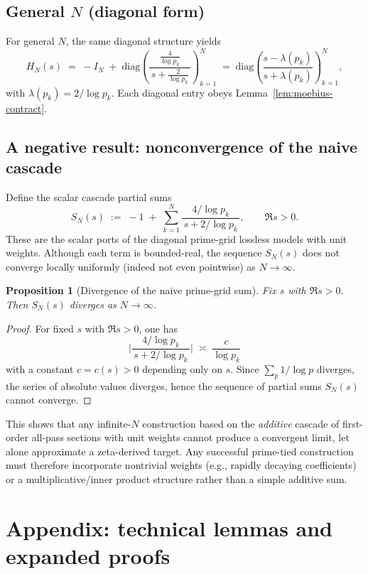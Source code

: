 \documentclass[11pt]{article}
\newtheorem{proposition}[theorem]{Proposition}
\theoremstyle{definition}
\theoremstyle{remark}
\begin{document}
\subsection*{General $N$ (diagonal form)}
For general \(N\), the same diagonal structure yields
\[
 H_N(s)\;=\;-I_N\; +\; \mathrm{diag}\!\left(\frac{\tfrac{4}{\log p_k}}{\,s+\tfrac{2}{\log p_k}\,}\right)_{k=1}^N\;=\;\mathrm{diag}\!\left(\frac{s-\lambda(p_k)}{s+\lambda(p_k)}\right)_{k=1}^N,
\]
with \(\lambda(p_k)=2/\log p_k\). Each diagonal entry obeys Lemma~\ref{lem:moebius-contract}.

\subsection*{A negative result: nonconvergence of the naive cascade}
Define the scalar cascade partial sums
\[
 S_N(s)\;:=\;-1\; +\;\sum_{k=1}^{N} \frac{4/\log p_k}{\,s+2/\log p_k\,},\qquad \Re s>0.
\]
These are the scalar ports of the diagonal prime-grid lossless models with unit weights. Although each term is bounded-real, the sequence \(S_N(s)\) does not converge locally uniformly (indeed not even pointwise) as \(N\to\infty\).

\begin{proposition}[Divergence of the naive prime-grid sum]\label{prop:divergence}
Fix \(s\) with \(\Re s>0\). Then \(S_N(s)\) diverges as \(N\to\infty\).
\end{proposition}
\begin{proof}
For fixed \(s\) with \(\Re s>0\), one has
\[
 \Big|\frac{4/\log p_k}{\,s+2/\log p_k\,}\Big|\;\asymp\; \frac{c}{\log p_k}
\]
with a constant \(c=c(s)>0\) depending only on \(s\). Since \(\sum_{p}\!1/\log p\) diverges, the series of absolute values diverges, hence the sequence of partial sums \(S_N(s)\) cannot converge.
\end{proof}
\noindent This shows that any infinite-$N$ construction based on the \emph{additive} cascade of first-order all-pass sections with unit weights cannot produce a convergent limit, let alone approximate a zeta-derived target. Any successful prime-tied construction must therefore incorporate nontrivial weights (e.g., rapidly decaying coefficients) or a multiplicative/inner product structure rather than a simple additive sum.
\section{Appendix: technical lemmas and expanded proofs}\label{sec:appendix}
\end{document}

